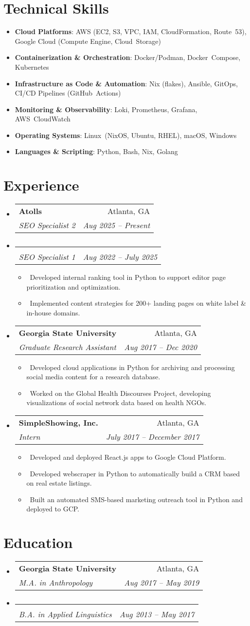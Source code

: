 \documentclass[letterpaper,11pt]{article}
\makeatletter
\newcommand{\resumeItem}[1]{
\item\small{#1}}
\newcommand{\resumeSubheading}[4]{
  \vspace{-1pt}
\item
  \begin{tabular*}{0.97\textwidth}[t]{l@{\extracolsep{\fill}}r}
    \textbf{#1} & #2 \\
    \textit{#3} & \textit{#4} \\
  \end{tabular*}\vspace{-7pt}
}
\newcommand{\resumeSubHeadingList}{
\begin{itemize}[leftmargin=0.15in, label={}]}
\newcommand{\resumeSubHeadingListEnd}{
  \end{itemize}}
\makeatother
\begin{document}
\section{Technical Skills}
\resumeSubHeadingList
\resumeItem{\textbf{Cloud Platforms}: AWS (EC2, S3, VPC, IAM,
CloudFormation, Route 53), Google Cloud (Compute Engine, Cloud Storage)}
\resumeItem{\textbf{Containerization \& Orchestration}:
Docker/Podman, Docker Compose, Kubernetes}
\resumeItem{\textbf{Infrastructure as Code \& Automation}: Nix
(flakes), Ansible, GitOps, CI/CD Pipelines (GitHub Actions)}
\resumeItem{\textbf{Monitoring \& Observability}: Loki, Prometheus,
Grafana, AWS CloudWatch}
\resumeItem{\textbf{Operating Systems}: Linux (NixOS, Ubuntu, RHEL),
macOS, Windows}
\resumeItem{\textbf{Languages \& Scripting}: Python, Bash, Nix, Golang}
\resumeSubHeadingListEnd


\section{Experience}
\resumeSubHeadingList
\resumeSubheading
{Atolls}{Atlanta, GA}
{SEO Specialist 2}{Aug 2025 -- Present}
\resumeSubheading
{}{}
{SEO Specialist 1}{Aug 2022 -- July 2025}
\resumeSubHeadingList
\resumeItem{\textbullet\ Developed internal ranking tool in Python to
support editor page prioritization and optimization.}
\resumeItem{\textbullet\ Implemented content strategies for 200+
landing pages on white label \& in-house domains.}
\resumeSubHeadingListEnd
\resumeSubheading
{Georgia State University}{Atlanta, GA}
{Graduate Research Assistant}{Aug 2017 -- Dec 2020}
\resumeSubHeadingList
\resumeItem{\textbullet\ Developed cloud applications in Python for
archiving and processing social media content for a research database.}
\resumeItem{\textbullet\ Worked on the Global Health Discourses
Project, developing visualizations of social network data based on health NGOs.}
\resumeSubHeadingListEnd
\resumeSubheading
{SimpleShowing, Inc.}{Atlanta, GA}
{Intern}{July 2017 -- December 2017}
\resumeSubHeadingList
\resumeItem{\textbullet\ Developed and deployed React.js apps to
Google Cloud Platform.}
\resumeItem{\textbullet\ Developed webscraper in Python to
automatically build a CRM based on real estate listings.}
\resumeItem{\textbullet\ Built an automated SMS-based marketing
outreach tool in Python and deployed to GCP.}
\resumeSubHeadingListEnd
\resumeSubHeadingListEnd

\section{Education}
\resumeSubHeadingList
\resumeSubheading
{Georgia State University}{Atlanta, GA}
{M.A. in Anthropology}{Aug 2017 -- May 2019}
\resumeSubheading
{}{}
{B.A. in Applied Linguistics}{Aug 2013 -- May 2017}
\resumeSubHeadingListEnd
\end{document}

